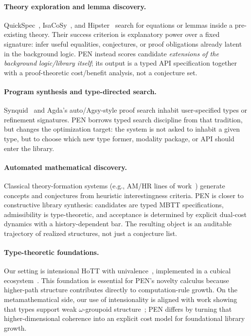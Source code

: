 \documentclass[11pt,a4paper]{article}
\theoremstyle{plain}
\theoremstyle{definition}
\theoremstyle{remark}
\begin{document}
\paragraph{Theory exploration and lemma discovery.}
QuickSpec~\cite{quickspec}, IsaCoSy~\cite{isacosy}, and Hipster~\cite{hipster} search for equations or lemmas inside a pre-existing theory.
Their success criterion is explanatory power over a fixed signature: infer useful equalities, conjectures, or proof obligations already latent in the background logic.
PEN instead scores candidate \emph{extensions of the background logic/library itself}; its output is a typed API specification together with a proof-theoretic cost/benefit analysis, not a conjecture set.

\paragraph{Program synthesis and type-directed search.}
Synquid~\cite{synquid} and Agda's auto/Agsy-style proof search inhabit user-specified types or refinement signatures.
PEN borrows typed search discipline from that tradition, but changes the optimization target: the system is not asked to inhabit a given type, but to choose which new type former, modality package, or API should enter the library.

\paragraph{Automated mathematical discovery.}
Classical theory-formation systems (e.g., AM/HR lines of work~\cite{lenat-am,colton-atf}) generate concepts and conjectures from heuristic interestingness criteria.
PEN is closer to constructive library synthesis: candidates are typed MBTT specifications, admissibility is type-theoretic, and acceptance is determined by explicit dual-cost dynamics with a history-dependent bar.
The resulting object is an auditable trajectory of realized structures, not just a conjecture list.

\paragraph{Type-theoretic foundations.}
Our setting is intensional HoTT with univalence~\cite{hott}, implemented in a cubical ecosystem~\cite{cubical,cubical-agda}.
This foundation is essential for PEN's novelty calculus because higher-path structure contributes directly to computation-rule growth.
On the metamathematical side, our use of intensionality is aligned with work showing that types support weak $\omega$-groupoid structure~\cite{lumsdaine,vdberg-garner}; PEN differs by turning that higher-dimensional coherence into an explicit cost model for foundational library growth.
\end{document}
